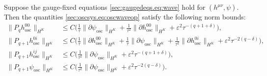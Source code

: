 \documentclass{article}
\newcommand{\osc}{\mathrm{osc}}
\newcommand{\ve}{\varepsilon}
\newcommand{\pa}{\partial}
\begin{document}
\begin{lemma}\label{sec:oscsys.lem:oscoperatorest}
    Suppose the gauge-fixed equations \eqref{sec:gaugedeqs.eq:wave} hold for $(h^{\mu\nu},\psi)$. Then the quantities \eqref{sec:oscsys.eq:oscwaveop} satisfy the following norm bounds:
    \begin{subequations}
        \begin{align}
            \|P_q h_{\osc}^{00}\|_{H^K} &\leq C\Big(\frac{1}{\tau}\|\pa \psi_{\osc}\|_{H^K} + \frac{1}{\tau^2}\|\pa h_{\osc}^{00}\|_{H^K} + \ve^2 \tau^{-(q+1+\delta)}\Big),\label{sec:oscsys.eq:oscwaveestlapse}\\
            \|P_{q+1} h_{\osc}^{0i}\|_{H^K} &\leq C\Big(\frac{1}{\tau}\|\pa h_{\osc}^{00}\|_{H^K} + \frac{1}{\tau}\|\pa \psi_{\osc}\|_{H^K}+ \frac{1}{\tau^2}\|\pa h_{\osc}^{0i}\|_{H^K}+\ve^2\tau^{-2(q-\delta)}\Big),\label{sec:oscsys.eq:oscwaveestshift}\\
            \|P_{q+1} h_{\osc}^{ij}\|_{H^K} &\leq C\Big(\frac{1}{\tau^2}\|\pa \psi_{\osc}\|_{H^K} + \ve^2\tau^{-(q+1+\delta)}\Big),\label{sec:oscsys.eq:oscwaveesthori}\\
            \|P_{q+1} \psi_{\osc}\|_{H^K} &\leq C\Big(\frac{1}{\tau^2}\|\pa \psi_{\osc}\|_{H^K} + \ve^2\tau^{-2(q-\delta)}\Big).\label{sec:oscsys.eq:oscwaveestscalar}
        \end{align}
    \end{subequations}
\end{lemma}
\end{document}
